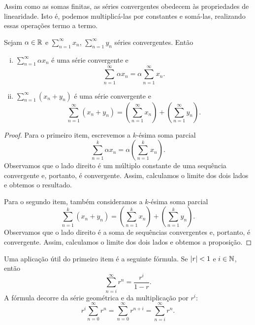 Assim como as somas finitas, as séries convergentes obedecem às propriedades de linearidade.
Isto é, podemos multiplicá-las por constantes
e somá-las, realizando essas operações termo a termo.

\begin{prop}
Sejam $\alpha \in {\mathbb{R}}$ e $\sum_{n=1}^\infty x_n$, $\sum_{n=1}^\infty y_n$
séries convergentes. Então
\begin{enumerate}[(i)]
\item
$\sum_{n=1}^\infty \alpha x_n$ é uma série convergente e
\begin{equation*}
\sum_{n=1}^\infty \alpha x_n
=
\alpha \sum_{n=1}^\infty x_n .
\end{equation*}
\item
$\sum_{n=1}^\infty ( x_n + y_n )$ é uma série convergente e
\begin{equation*}
\sum_{n=1}^\infty ( x_n + y_n ) 
=
\left( \sum_{n=1}^\infty x_n \right)
+
\left( \sum_{n=1}^\infty y_n \right) .
\end{equation*}
\end{enumerate}
\end{prop}

\begin{proof}
Para o primeiro item,
escrevemos a $k$-ésima soma parcial
\begin{equation*}
\sum_{n=1}^k \alpha x_n
=
\alpha \left( \sum_{n=1}^k x_n \right) .
\end{equation*}
Observamos que o lado direito é um múltiplo constante de
uma sequência convergente e, portanto, é convergente. Assim, calculamos o limite dos dois lados e obtemos
o resultado.

Para o segundo item, também consideramos a
$k$-ésima soma parcial
\begin{equation*}
\sum_{n=1}^k ( x_n + y_n ) 
=
\left( \sum_{n=1}^k x_n \right)
+
\left( \sum_{n=1}^k y_n \right) .
\end{equation*}
Observamos que o lado direito é a soma de sequências convergentes
e, portanto, é convergente. Assim, calculamos o limite dos dois lados e obtemos
a proposição.
\end{proof}

Uma aplicação útil do primeiro item é a seguinte
fórmula. Se $\lvert {r} \rvert < 1$ e $i \in {\mathbb{N}}$, então
\begin{equation*}
\sum_{n=i}^\infty r^n = \frac{r^i}{1-r} .
\end{equation*}
A fórmula decorre da série geométrica e da multiplicação por
$r^i$:
\begin{equation*}
r^i \sum_{n=0}^\infty r^n =
\sum_{n=0}^\infty r^{n+i}
=
\sum_{n=i}^\infty r^n .
\end{equation*}

